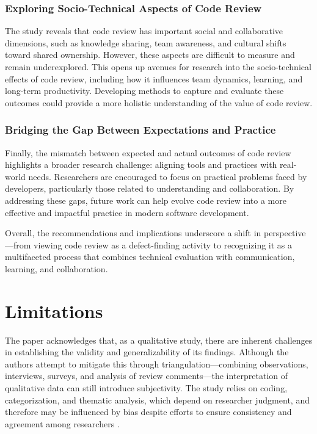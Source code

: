 \subsubsection{Exploring Socio-Technical Aspects of Code Review}
The study reveals that code review has important social and collaborative dimensions, such as knowledge sharing, team awareness, and cultural shifts toward shared ownership. However, these aspects are difficult to measure and remain underexplored. This opens up avenues for research into the socio-technical effects of code review, including how it influences team dynamics, learning, and long-term productivity. Developing methods to capture and evaluate these outcomes could provide a more holistic understanding of the value of code review.

\subsubsection{Bridging the Gap Between Expectations and Practice}
Finally, the mismatch between expected and actual outcomes of code review highlights a broader research challenge: aligning tools and practices with real-world needs. Researchers are encouraged to focus on practical problems faced by developers, particularly those related to understanding and collaboration. By addressing these gaps, future work can help evolve code review into a more effective and impactful practice in modern software development.

Overall, the recommendations and implications underscore a shift in perspective—from viewing code review as a defect-finding activity to recognizing it as a multifaceted process that combines technical evaluation with communication, learning, and collaboration.

\section{Limitations}
The paper acknowledges that, as a qualitative study, there are inherent challenges in establishing the validity and generalizability of its findings. Although the authors attempt to mitigate this through triangulation—combining observations, interviews, surveys, and analysis of review comments—the interpretation of qualitative data can still introduce subjectivity. The study relies on coding, categorization, and thematic analysis, which depend on researcher judgment, and therefore may be influenced by bias despite efforts to ensure consistency and agreement among researchers \cite{golafshani2003understanding}.

